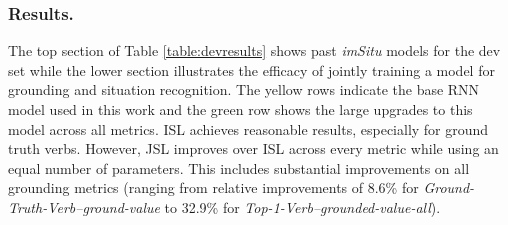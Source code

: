 \documentclass[runningheads]{llncs}
\newcommand{\dataset}{\mbox{\sc{SW}}i\mbox{\sc{G}}\xspace}
\newcommand{\imsitu}{\emph{imSitu}\xspace}
\begin{document}
\begin{table}[h!]
\setlength{\tabcolsep}{3pt}
\centering
\caption{Evaluation of models on the \dataset{} test set. * indicates our implementation}
\vspace{-2mm}
\label{table:testresults}
\vspace{-6mm}
\end{table}

\vspace{-5mm}
\subsubsection{Results. }
The top section of Table \ref{table:devresults} shows past \imsitu models for the dev set while the lower section illustrates the efficacy of jointly training a model for grounding and situation recognition. The yellow rows indicate the base RNN model used in this work and the green row shows the large upgrades to this model across all metrics. ISL achieves reasonable results, especially for ground truth verbs. However, JSL improves over ISL across every metric while using an equal number of parameters. This includes substantial improvements on all grounding metrics (ranging from relative improvements of 8.6\% for \emph{Ground-Truth-Verb--ground-value} to 32.9\% for \emph{Top-1-Verb--grounded-value-all}). 
\end{document}
